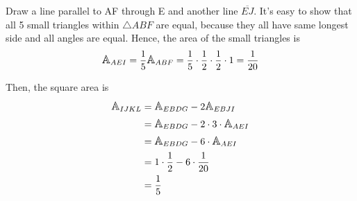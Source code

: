 \documentclass[12pt]{simple_doc}
\begin{document}
    Draw a line parallel to AF through E and another line $\overline{EJ}$.
    It's easy to show that all 5 small triangles within $\triangle ABF$ are equal,
    because they all have same longest side and all angles are equal.
    Hence, the area of the small triangles is
    \begin{equation}
        {\mathlarger{\mathbb{A}}}_{AEI}
        = \frac{1}{5}{\mathlarger{\mathbb{A}}}_{ABF}
        = \frac{1}{5} \cdot \frac{1}{2} \cdot \frac{1}{2} \cdot 1
        = \frac{1}{20}\label{eq:smallarea}
    \end{equation}

    Then, the square area is
    \begin{equation}
        \begin{aligned}
            {\mathlarger{\mathbb{A}}}_{IJKL}
            &= {\mathlarger{\mathbb{A}}}_{EBDG} - 2 {\mathlarger{\mathbb{A}}}_{EBJI}\\
            &= {\mathlarger{\mathbb{A}}}_{EBDG} - 2 \cdot 3 \cdot {\mathlarger{\mathbb{A}}}_{AEI}\\
            &= {\mathlarger{\mathbb{A}}}_{EBDG} - 6 \cdot {\mathlarger{\mathbb{A}}}_{AEI}\\
            &= 1 \cdot \frac{1}{2} - 6 \cdot \frac{1}{20}\\
            &= \frac{1}{5}
        \end{aligned}\label{eq:square}
    \end{equation}
\end{document}
